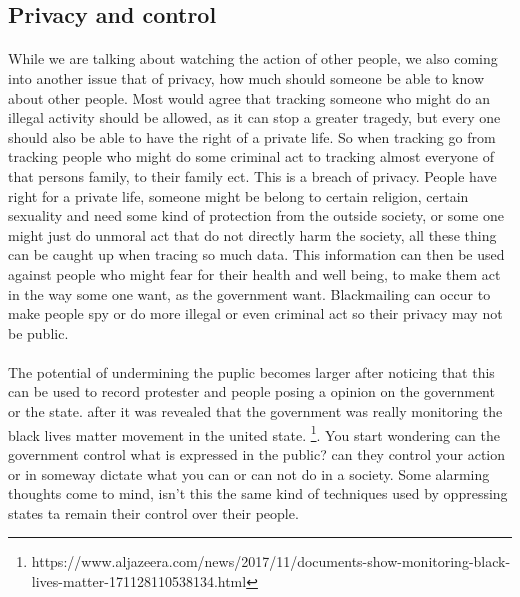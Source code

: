 \documentclass{article}
\begin{document}
\subsection{Privacy and control}
\paragraph{}
While we are talking about watching the action of other people, we also coming into another issue that of privacy, how much should someone be able to know about other people. Most would agree that tracking someone who might do an illegal activity should be allowed, as it can stop a greater tragedy, but every one should also be able to have the right of a private life. So when tracking go from tracking people who might do some criminal act to tracking almost everyone of that persons family, to their family ect. This is a breach of privacy. People have right for a private life, someone might be belong to certain religion, certain sexuality and need some kind of protection from the outside society, or some one might just do unmoral act that do not directly harm the society, all these thing can be caught up when tracing so much data. This information can then be used against people who might fear for their health and well being, to make them act in the way some one want, as the government want. Blackmailing can occur to make people spy or do more illegal or even criminal act so their privacy may not be public.

\paragraph{}
The potential of undermining the puplic becomes larger after noticing that this can be used to record protester and people posing a opinion on the government or the state. after it was revealed that the government was really monitoring the black lives matter movement in the united state. \footnote{https://www.aljazeera.com/news/2017/11/documents-show-monitoring-black-lives-matter-171128110538134.html}. You start wondering can the government control what is expressed in the public? can they control your action or in someway dictate what you can or can not do in a society. Some alarming thoughts come to mind, isn't this the same kind of techniques used by oppressing states ta remain their control over their people. 
\end{document}
